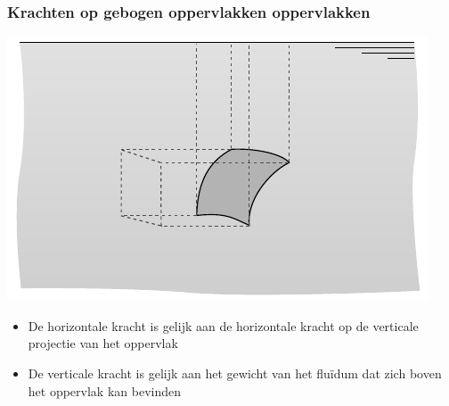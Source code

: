 \documentclass[t]{beamer}
\begin{document}
  		\begin{frame}
			\frametitle{Krachten op gebogen oppervlakken oppervlakken}
			\center
			\includegraphics[scale=0.9]{../fig/hydrostatica/kracht_gebogen_oppervlak_vereenvoudigd_3d}
			\onslide<2->{
				\begin{equation}
					\diff F_r = -p \vt{n} \cdot \vt{r} \diff A
				\end{equation}
			}
			\vspace{-0.7cm}
			\begin{itemize}
				\item<3-> De horizontale kracht is gelijk aan de horizontale kracht op de verticale projectie van het oppervlak
				\item<4-> De verticale kracht is gelijk aan het gewicht van het fluïdum dat zich boven het oppervlak kan bevinden
			\end{itemize}
  		\end{frame}
\end{document}
